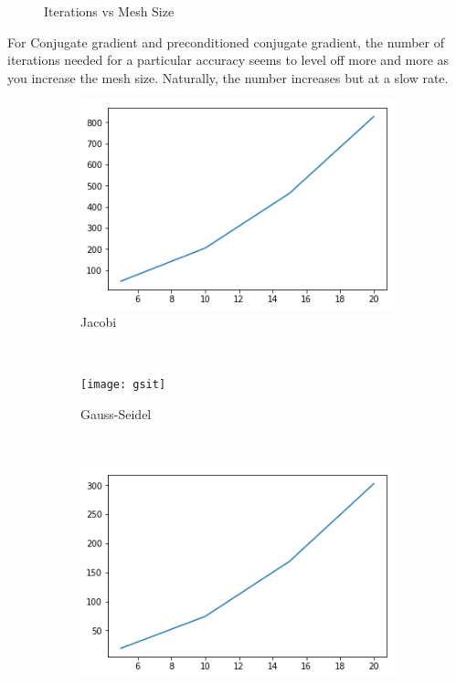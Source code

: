 \documentclass[letterpaper,12pt]{article}
\begin{document}
\begin{enumerate}
\begin{figure}[H]
    \caption{Iterations vs Mesh Size}\label{fig:animals}
\end{figure}
For Conjugate gradient and preconditioned conjugate gradient, the number of iterations needed for a particular accuracy seems to level off more and more as you increase the mesh size. Naturally, the number increases but at a slow rate.
\begin{figure}[H]
    \centering
    \begin{subfigure}[b]{0.3\textwidth}
        \includegraphics[width=\textwidth]{jit}
        \caption{Jacobi}
        \label{fig:gull}
    \end{subfigure}
    ~ %
    \begin{subfigure}[b]{0.3\textwidth}
        \texttt{[image: gsit]}
        \caption{Gauss-Seidel}
        \label{fig:tiger}
    \end{subfigure}
    ~ %
    \begin{subfigure}[b]{0.3\textwidth}
        \includegraphics[width=\textwidth]{sorit}

\end{subfigure}
\end{figure}
\end{enumerate}
\end{document}
